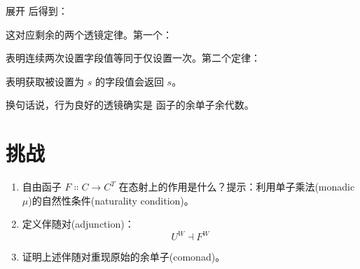 展开  后得到：

这对应剩余的两个透镜定律。第一个：

表明连续两次设置字段值等同于仅设置一次。第二个定律：

表明获取被设置为 $s$ 的字段值会返回 $s$。

换句话说，行为良好的透镜确实是  函子的余单子余代数。

\section{挑战}

\begin{enumerate}
  \tightlist
  \item
        自由函子 $F \Colon C \to C^T$ 在态射上的作用是什么？提示：利用单子乘法(monadic $\mu$)的自然性条件(naturality condition)。
  \item
        定义伴随对(adjunction)：
        \[U^W \dashv F^W\]
  \item
        证明上述伴随对重现原始的余单子(comonad)。
\end{enumerate}